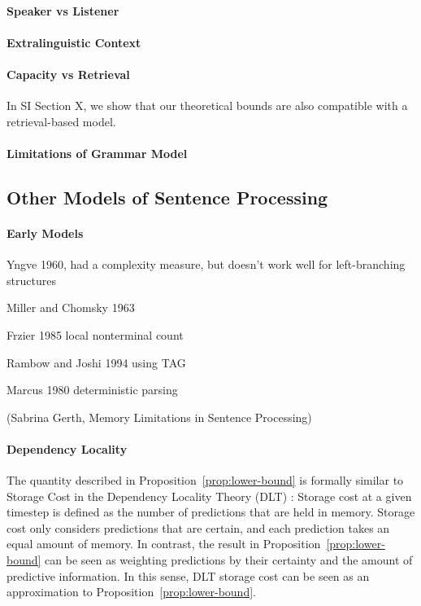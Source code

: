 
\paragraph{Speaker vs Listener}

\paragraph{Extralinguistic Context}

\paragraph{Capacity vs Retrieval}


In SI Section X, we show that our theoretical bounds are also compatible with a retrieval-based model.


\paragraph{Limitations of Grammar Model}


\subsection{Other Models of Sentence Processing}

\paragraph{Early Models}

Yngve 1960, had a complexity measure, but doesn't work well for left-branching structures

Miller and Chomsky 1963

Frzier 1985 local nonterminal count

Rambow and Joshi 1994 using TAG

Marcus 1980 deterministic parsing

(Sabrina Gerth, Memory Limitations in Sentence Processing)


\paragraph{Dependency Locality}
The quantity described in Proposition~\ref{prop:lower-bound} is formally similar to Storage Cost in the Dependency Locality Theory (DLT) \citep{gibson-linguistic-1998}: Storage cost at a given timestep is defined as the number of predictions that are held in memory.
Storage cost only considers predictions that are certain, and each prediction takes an equal amount of memory.
In contrast, the result in Proposition~\ref{prop:lower-bound} can be seen as weighting predictions by their certainty and the amount of predictive information.
In this sense, DLT storage cost can be seen as an approximation to Proposition~\ref{prop:lower-bound}.

